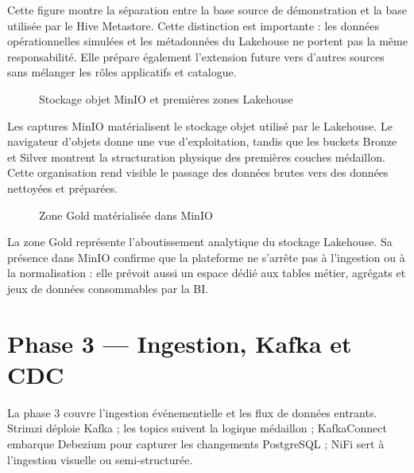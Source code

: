 Cette figure montre la séparation entre la base source de démonstration et la base utilisée par le Hive Metastore. Cette distinction est importante : les données opérationnelles simulées et les métadonnées du Lakehouse ne portent pas la même responsabilité. Elle prépare également l'extension future vers d'autres sources sans mélanger les rôles applicatifs et catalogue.

\begin{figure}[H]
\centering
{}
\caption{Stockage objet MinIO et premières zones Lakehouse}
\label{fig:realisation-minio-bronze-silver}
\end{figure}

Les captures MinIO matérialisent le stockage objet utilisé par le Lakehouse. Le navigateur d'objets donne une vue d'exploitation, tandis que les buckets Bronze et Silver montrent la structuration physique des premières couches médaillon. Cette organisation rend visible le passage des données brutes vers des données nettoyées et préparées.

\begin{figure}[H]
\centering
{}
\caption{Zone Gold matérialisée dans MinIO}
\label{fig:realisation-minio-gold}
\end{figure}

La zone Gold représente l'aboutissement analytique du stockage Lakehouse. Sa présence dans MinIO confirme que la plateforme ne s'arrête pas à l'ingestion ou à la normalisation : elle prévoit aussi un espace dédié aux tables métier, agrégats et jeux de données consommables par la BI.

\section{Phase 3 — Ingestion, Kafka et CDC}

La phase 3 couvre l'ingestion événementielle et les flux de données entrants. Strimzi déploie Kafka ; les topics suivent la logique médaillon ; KafkaConnect embarque Debezium pour capturer les changements PostgreSQL ; NiFi sert à l'ingestion visuelle ou semi-structurée.

